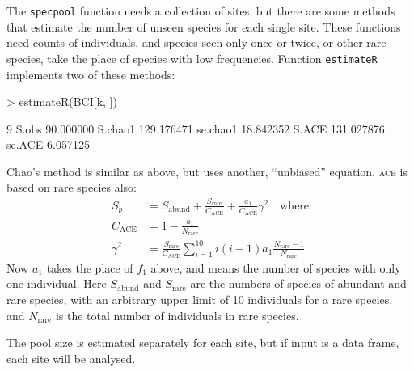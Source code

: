 \documentclass[a4paper,10pt]{amsart}
\begin{document}
The \texttt{specpool} function needs a collection of sites, but there
are some methods that estimate the number of unseen species for each
single site.  These functions need counts of individuals, and species
seen only once or twice, or other rare species, take the place of
species with low frequencies.  Function \texttt{estimateR} implements
two of these methods:
\begin{Schunk}
\begin{Sinput}
> estimateR(BCI[k, ])
\end{Sinput}
\begin{Soutput}
                  9
S.obs     90.000000
S.chao1  129.176471
se.chao1  18.842352
S.ACE    131.027876
se.ACE     6.057125
\end{Soutput}
\end{Schunk}
Chao's method is similar as above, but uses another, ``unbiased''
equation. \textsc{ace} is based on rare species also:
\begin{equation}
\begin{split}
S_p &= S_\mathrm{abund} + \frac{S_\mathrm{rare}}{C_\mathrm{ACE}} +
\frac{a_1}{C_\mathrm{ACE}} \gamma^2 \quad \text{where}\\
C_\mathrm{ACE} &= 1 - \frac{a_1}{N_\mathrm{rare}}\\
\gamma^2 &= \frac{S_\mathrm{rare}}{C_\mathrm{ACE}} \sum_{i=1}^{10} i
(i-1) a_1 \frac{N_\mathrm{rare} - 1}{N_\mathrm{rare}}
\end{split}
\end{equation}
Now $a_1$ takes the place of $f_1$ above, and means the number of
species with only one individual.
Here $S_\mathrm{abund}$ and $S_\mathrm{rare}$ are the numbers of
species of abundant and rare species, with an arbitrary upper limit of
10 individuals for a rare species, and $N_\mathrm{rare}$ is the total
number of individuals in rare species.

The pool size
is estimated separately for each site, but if input is a data frame,
each site will be analysed.
\end{document}
